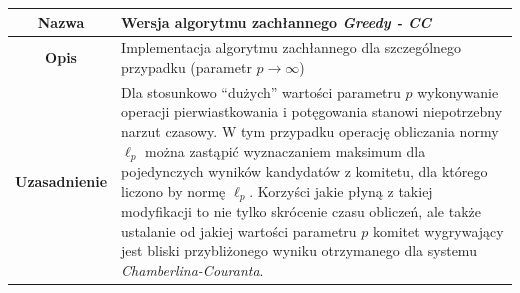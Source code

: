 \documentclass[polish,11pt]{aghthesis}
\begin{document}
{
\centering
\begin{tabular}{|c|p{10cm}|}
\hline
\textbf{Nazwa} & Wersja algorytmu zachłannego \textit{Greedy - CC} \\ 
\hline 
\textbf{Opis} & Implementacja algorytmu zachłannego dla szczególnego przypadku
(parametr $p \to \infty$) \\ 
\hline 
\textbf{Uzasadnienie} & Dla stosunkowo ``dużych'' wartości parametru $p$ wykonywanie operacji
pierwiastkowania i potęgowania stanowi niepotrzebny narzut czasowy.
W tym przypadku operację obliczania normy $\ell_p$ można zastąpić
wyznaczaniem maksimum dla pojedynczych wyników kandydatów z
komitetu, dla którego liczono by normę $\ell_p$.
Korzyści jakie płyną z takiej modyfikacji to nie tylko skrócenie czasu
obliczeń, ale także ustalanie od jakiej wartości parametru $p$ komitet
wygrywający jest bliski przybliżonego wyniku otrzymanego dla systemu
\textit{Chamberlina-Couranta}.\\ 
\hline 
\end{tabular} 
}
\vspace{\baselineskip}
\end{document}
